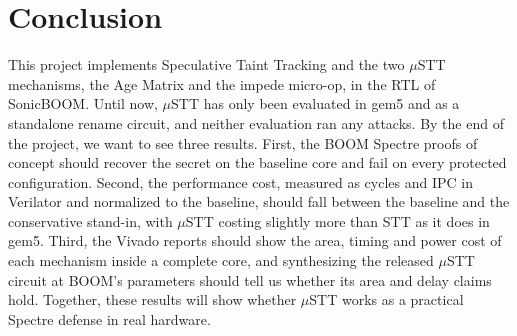 \section{Conclusion}
\label{sec:conclusion}


This project implements Speculative Taint Tracking and the two $\mu$STT mechanisms,
the Age Matrix and the impede micro-op, in the RTL of SonicBOOM. Until now, $\mu$STT
has only been evaluated in gem5 and as a standalone rename circuit, and neither
evaluation ran any attacks. By the end of the project, we want to see three results.
First, the BOOM Spectre proofs of concept should recover the secret on the baseline
core and fail on every protected configuration. Second, the performance cost, measured
as cycles and IPC in Verilator and normalized to the baseline, should fall between the
baseline and the conservative stand-in, with $\mu$STT costing slightly more than STT
as it does in gem5. Third, the Vivado reports should show the area, timing and power
cost of each mechanism inside a complete core, and synthesizing the released $\mu$STT
circuit at BOOM's parameters should tell us whether its area and delay claims hold.
Together, these results will show whether $\mu$STT works as a practical Spectre
defense in real hardware.

